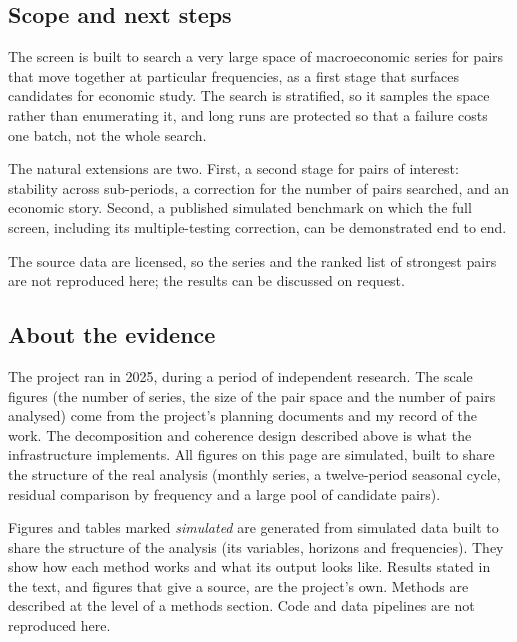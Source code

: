 \documentclass[
  british,
  a4paper,
]{article}
\begin{document}
\subsection{Scope and next steps}\label{scope-and-next-steps}

The screen is built to search a very large space of macroeconomic series
for pairs that move together at particular frequencies, as a first stage
that surfaces candidates for economic study. The search is stratified,
so it samples the space rather than enumerating it, and long runs are
protected so that a failure costs one batch, not the whole search.

The natural extensions are two. First, a second stage for pairs of
interest: stability across sub-periods, a correction for the number of
pairs searched, and an economic story. Second, a published simulated
benchmark on which the full screen, including its multiple-testing
correction, can be demonstrated end to end.

The source data are licensed, so the series and the ranked list of
strongest pairs are not reproduced here; the results can be discussed on
request.

\subsection{About the evidence}\label{about-the-evidence}

The project ran in 2025, during a period of independent research. The
scale figures (the number of series, the size of the pair space and the
number of pairs analysed) come from the project's planning documents and
my record of the work. The decomposition and coherence design described
above is what the infrastructure implements. All figures on this page
are simulated, built to share the structure of the real analysis
(monthly series, a twelve-period seasonal cycle, residual comparison by
frequency and a large pool of candidate pairs).

Figures and tables marked \emph{simulated} are generated from simulated
data built to share the structure of the analysis (its variables,
horizons and frequencies). They show how each method works and what its
output looks like. Results stated in the text, and figures that give a
source, are the project's own. Methods are described at the level of a
methods section. Code and data pipelines are not reproduced here.
\end{document}
